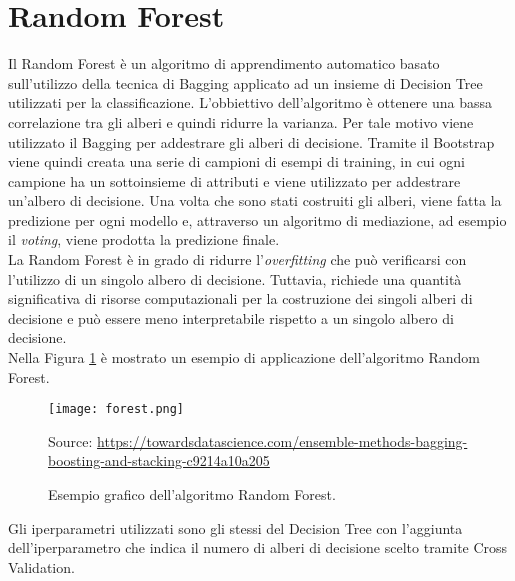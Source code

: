 \section{Random Forest}
Il Random Forest \autocite{ho1995random} è un algoritmo di apprendimento automatico basato sull'utilizzo della tecnica di Bagging applicato ad un insieme di Decision Tree utilizzati per la classificazione. L'obbiettivo dell'algoritmo è ottenere una bassa correlazione tra gli alberi e quindi ridurre la varianza. Per tale motivo viene utilizzato il Bagging per addestrare gli alberi di decisione. Tramite il Bootstrap viene quindi creata una serie di campioni di esempi di training, in cui ogni campione ha un sottoinsieme di attributi e viene utilizzato per addestrare un'albero di decisione. Una volta che sono stati costruiti gli alberi, viene fatta la predizione per ogni modello e, attraverso un algoritmo di mediazione, ad esempio il \emph{voting}, viene prodotta la predizione finale.\\
La Random Forest è in grado di ridurre l'\emph{overfitting} che può verificarsi con l'utilizzo di un singolo albero di decisione. Tuttavia, richiede una quantità significativa di risorse computazionali per la costruzione dei singoli alberi di decisione e può essere meno interpretabile rispetto a un singolo albero di decisione.\\
Nella Figura \ref{fig:forest} è mostrato un esempio di applicazione dell'algoritmo Random Forest.
\begin{figure}[h]
	\begin{center}
		\texttt{[image: forest.png]}
		\caption{Esempio grafico dell'algoritmo Random Forest.
		} 
		Source: \url{https://towardsdatascience.com/ensemble-methods-bagging-boosting-and-stacking-c9214a10a205}\label{fig:forest}
	\end{center}
\end{figure}
Gli iperparametri utilizzati sono gli stessi del Decision Tree con l'aggiunta dell'iperparametro che indica il numero di alberi di decisione scelto tramite Cross Validation.
